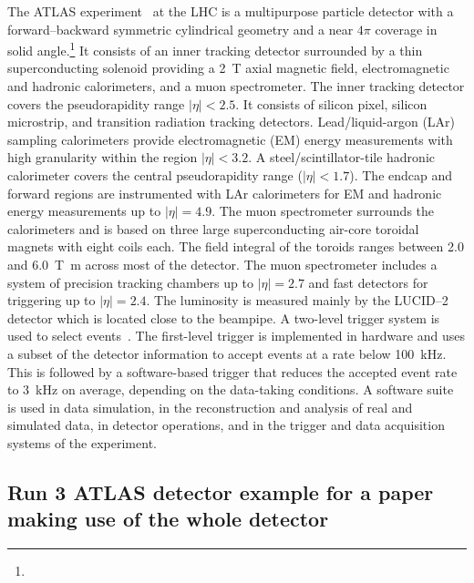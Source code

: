The ATLAS experiment~\cite{PERF-2007-01,GENR-2019-02} at the LHC is a multipurpose particle detector
with a forward--backward symmetric cylindrical geometry and a near \(4\pi\) coverage in 
solid angle.\footnote{\AtlasCoordFootnote}
It consists of an inner tracking detector surrounded by a thin superconducting solenoid
providing a \qty{2}{\tesla} axial magnetic field, electromagnetic and hadronic calorimeters, and a muon spectrometer.
The inner tracking detector covers the pseudorapidity range \(|\eta| < 2.5\).
It consists of silicon pixel, silicon microstrip, and transition radiation tracking detectors.
Lead/liquid-argon (LAr) sampling calorimeters provide electromagnetic (EM) energy measurements
with high granularity within the region \(|\eta|< 3.2\).
A steel/scintillator-tile hadronic calorimeter covers the central pseudorapidity range (\(|\eta| < 1.7\)).
The endcap and forward regions are instrumented with LAr calorimeters
for EM and hadronic energy measurements up to \(|\eta| = 4.9\).
The muon spectrometer surrounds the calorimeters and is based on
three large superconducting air-core toroidal magnets with eight coils each.
The field integral of the toroids ranges between \num{2.0} and \qty{6.0}{\tesla\metre}
across most of the detector. 
The muon spectrometer includes a system of precision tracking chambers up to \(|\eta| = 2.7\) and fast detectors for triggering up to \(|\eta| = 2.4\).
The luminosity is measured mainly by the LUCID--2 detector which is located close to the beampipe.
A two-level trigger system is used to select events~\cite{TRIG-2016-01}. 
The first-level trigger is implemented in hardware and uses a subset of the detector information
to accept events at a rate below \qty{100}{\kHz}.
This is followed by a software-based trigger that
reduces the accepted event rate to \qty{3}{\kHz} on average,
depending on the data-taking conditions.
A software suite~\cite{ATL-SOFT-PUB-2021-001} is used in data simulation, in the reconstruction
and analysis of real and simulated data, in detector operations, and in the trigger and data acquisition
systems of the experiment.

\subsection{Run 3 ATLAS detector example for a paper making use of the whole detector}
\label{sec:atlas3b}

